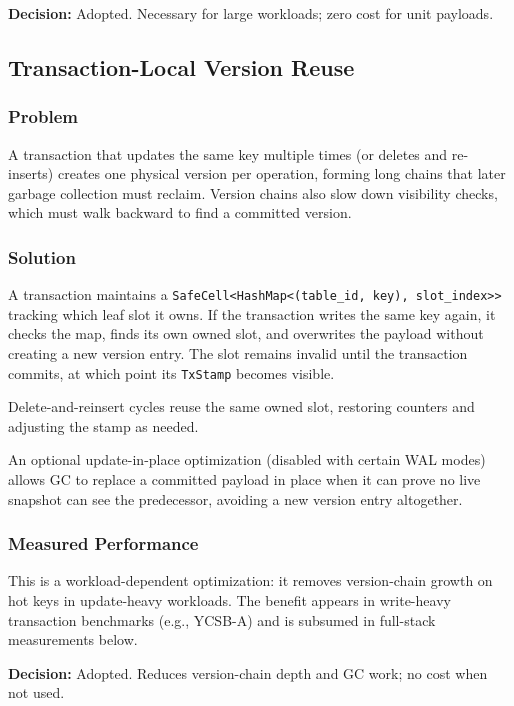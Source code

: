 \documentclass[11pt]{article}
\newcommand{\code}[1]{\texttt{#1}}
\begin{document}
\textbf{Decision:} Adopted. Necessary for large workloads; zero cost for unit payloads.

\subsection{Transaction-Local Version Reuse}

\subsubsection{Problem}

A transaction that updates the same key multiple times (or deletes and re-inserts) creates
one physical version per operation, forming long chains that later garbage collection must
reclaim. Version chains also slow down visibility checks, which must walk backward to find
a committed version.

\subsubsection{Solution}

A transaction maintains a \code{SafeCell<HashMap<(table\_id, key), slot\_index>>} tracking
which leaf slot it owns. If the transaction writes the same key again, it checks the map,
finds its own owned slot, and overwrites the payload without creating a new version entry.
The slot remains invalid until the transaction commits, at which point its \code{TxStamp}
becomes visible.

Delete-and-reinsert cycles reuse the same owned slot, restoring counters and adjusting the
stamp as needed.

An optional update-in-place optimization (disabled with certain WAL modes) allows GC to
replace a committed payload in place when it can prove no live snapshot can see the
predecessor, avoiding a new version entry altogether.

\subsubsection{Measured Performance}

This is a workload-dependent optimization: it removes version-chain growth on hot keys in
update-heavy workloads. The benefit appears in write-heavy transaction benchmarks
(e.g., YCSB-A) and is subsumed in full-stack measurements below.

\textbf{Decision:} Adopted. Reduces version-chain depth and GC work; no cost when not used.
\end{document}
